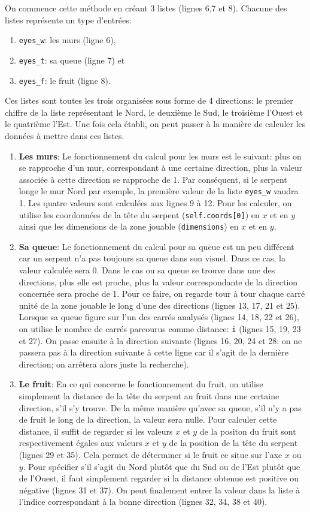 \documentclass[12pt, a4paper, openany]{book}
\begin{document}
On commence cette méthode en créant 3 listes (lignes 6,7 et 8). Chacune des listes représente un type d'entrées:
\begin{enumerate}
	\item \verb'eyes_w': les murs (ligne 6),
	\item \verb'eyes_t': sa queue (ligne 7) et 
	\item \verb'eyes_f': le fruit (ligne 8).
\end{enumerate}
Ces listes sont toutes les trois organisées sous forme de 4 directions: le premier chiffre de la liste représentant le Nord, le deuxième le Sud, le troisième l'Ouest et le quatrième l'Est. Une fois cela établi, on peut passer à la manière de calculer les données à mettre dans ces listes.
\begin{enumerate}
	\item \textbf{Les murs}:
	Le fonctionnement du calcul pour les murs est le suivant: plus on se rapproche d'un mur, correspondant à une certaine direction, plus la valeur associée à cette direction se rapproche de 1. Par conséquent, si le serpent longe le mur Nord par exemple, la première valeur de la liste \verb'eyes_w' vaudra 1. Les quatre valeurs sont calculées aux lignes 9 à 12. Pour les calculer, on utilise les coordonnées de la tête du serpent (\verb'self.coords[0]') en $x$ et en $y$ ainsi que les dimensions de la zone jouable (\verb'dimensions') en $x$ et en $y$.
	\item \textbf{Sa queue}:
	Le fonctionnement du calcul pour sa queue est un peu différent car un serpent n'a pas toujours sa queue dans son visuel. Dans ce cas, la valeur calculée sera 0. Dans le cas ou sa queue se trouve dans une des directions, plus elle est proche, plus la valeur correspondante de la direction concernée sera proche de 1.  Pour ce faire, on regarde tour à tour chaque carré unité de la zone jouable le long d'une des directions (lignes 13, 17, 21 et 25). Lorsque sa queue figure sur l'un des carrés analysés (lignes 14, 18, 22 et 26), on utilise le nombre de carrés parcourus comme distance: \verb'i' (lignes 15, 19, 23 et 27). On passe ensuite à la direction suivante (lignes 16, 20, 24 et 28: on ne passera pas à la direction suivante à cette ligne car il s'agit de la dernière direction; on arrêtera alors juste la recherche).
	
	\item \textbf{Le fruit}:
	En ce qui concerne le fonctionnement du fruit, on utilise simplement la distance de la tête du serpent au fruit dans une certaine direction, s'il s'y trouve. De la même manière qu'avec sa queue, s'il n'y a pas de fruit le long de la direction, la valeur sera nulle. Pour calculer cette distance, il suffit de regarder si les valeurs $x$ et $y$ de la positon du fruit sont respectivement égales aux valeurs $x$ et $y$ de la position de la tête du serpent (lignes 29 et 35). Cela permet de déterminer si le fruit ce situe sur l'axe $x$ ou $y$. Pour spécifier s'il s'agit du Nord plutôt que du Sud ou de l'Est plutôt que de l'Ouest, il faut simplement regarder si la distance obtenue est positive ou négative (lignes 31 et 37). On peut finalement entrer la valeur dans la liste à l'indice correspondant à la bonne direction (lignes 32, 34, 38 et 40).
\end{enumerate}
\end{document}
